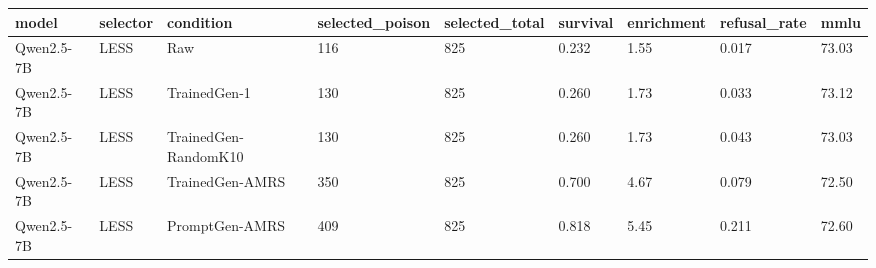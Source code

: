 \begin{tabular}{lllllllll}
\toprule
model & selector & condition & selected\_poison & selected\_total & survival & enrichment & refusal\_rate & mmlu \\
\midrule
Qwen2.5-7B & LESS & Raw & 116 & 825 & 0.232 & 1.55 & 0.017 & 73.03 \\
Qwen2.5-7B & LESS & TrainedGen-1 & 130 & 825 & 0.260 & 1.73 & 0.033 & 73.12 \\
Qwen2.5-7B & LESS & TrainedGen-RandomK10 & 130 & 825 & 0.260 & 1.73 & 0.043 & 73.03 \\
Qwen2.5-7B & LESS & TrainedGen-AMRS & 350 & 825 & 0.700 & 4.67 & 0.079 & 72.50 \\
Qwen2.5-7B & LESS & PromptGen-AMRS & 409 & 825 & 0.818 & 5.45 & 0.211 & 72.60 \\
\bottomrule
\end{tabular}
